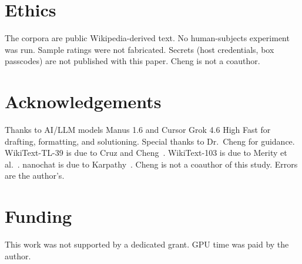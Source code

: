 \documentclass[11pt,a4paper]{article}
\begin{document}
\section*{Ethics}
The corpora are public Wikipedia-derived text. No human-subjects experiment was run. Sample ratings were not fabricated. Secrets (host credentials, box passcodes) are not published with this paper. Cheng is not a coauthor.

\section*{Acknowledgements}
Thanks to AI/LLM models Manus 1.6 and Cursor Grok 4.6 High Fast for drafting, formatting, and solutioning. Special thanks to Dr.~Cheng for guidance. WikiText-TL-39 is due to Cruz and Cheng~\cite{cruz2019eval}. WikiText-103 is due to Merity et al.~\cite{merity2017pointer}. nanochat is due to Karpathy~\cite{karpathy2026nanochat}. Cheng is not a coauthor of this study. Errors are the author's.

\section*{Funding}
This work was not supported by a dedicated grant. GPU time was paid by the author.
\end{document}
